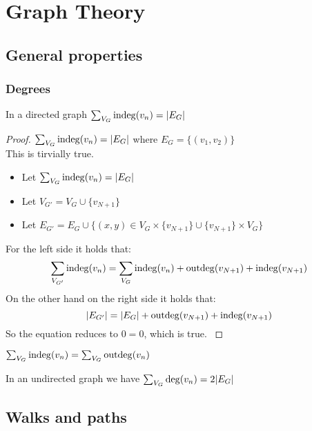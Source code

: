 \section{Graph Theory}

\subsection{General properties}

\subsubsection{Degrees}

\begin{theorem} \label{sumIndegreesIsNrEdges}
    In a directed graph $\sum_{V_G} \operatorname{indeg}(v_n) = |E_G|$
\end{theorem}

\begin{proof}
    {$\sum_{V_G} \operatorname{indeg}(v_n) = |E_G|$ where $E_G = \{(v_1, v_2)\}$ \\}
    {This is tirvially true.}
    {
    \begin{itemize}
        \item Let $\sum_{V_G} \operatorname{indeg}(v_n) = |E_G|$ 
        \item Let $V_{G'} = V_G \cup \{v_{N+1}\}$
        \item Let $E_{G'} = E_G \cup \{(x, y) \in V_G \times \{v_{N+1}\} \cup \{v_{N+1}\} \times V_G \}$
    \end{itemize}
    }
    {
     For the left side it holds that: 
                $$ \sum_{V_{G'}} \operatorname{indeg}(v_n) = \sum_{V_G} \operatorname{indeg}(v_n) + \operatorname{outdeg}(v_{N+1}) + \operatorname{indeg}(v_{N+1}) $$
                On the other hand on the right side it holds that: 
                $$ |E_{G'}| = |E_G| + \operatorname{outdeg}(v_{N+1}) + \operatorname{indeg}(v_{N+1}) $$
                So the equation reduces to $0=0$, which is true.
    }
\end{proof}


\begin{lemma} \label{indegIsOutdeg}
    $\sum_{V_G} \operatorname{indeg}(v_n) = \sum_{V_G} \operatorname{outdeg}(v_n)$
\end{lemma}

\begin{lemma}
    In an undirected graph we have $\sum_{V_G} \operatorname{deg}(v_n) = 2|E_G|$
\end{lemma}

\subsection{Walks and paths}

